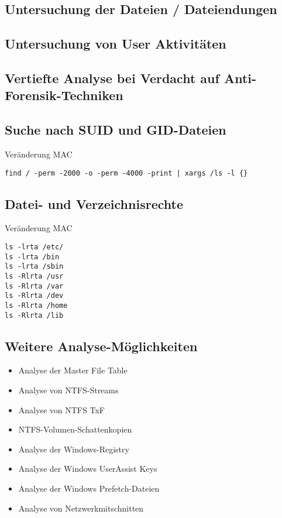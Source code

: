 \subsection{Untersuchung der Dateien / Dateiendungen}

\subsection{Untersuchung von User Aktivitäten}

\subsection{Vertiefte Analyse bei Verdacht auf Anti-Forensik-Techniken}

\subsection{Suche nach SUID und GID-Dateien}
Veränderung MAC
\begin{verbatim}
find / -perm -2000 -o -perm -4000 -print | xargs /ls -l {}
\end{verbatim}

\subsection{Datei- und Verzeichnisrechte}
Veränderung MAC
\begin{verbatim}
ls -lrta /etc/
ls -lrta /bin
ls -lrta /sbin
ls -Rlrta /usr
ls -Rlrta /var
ls -Rlrta /dev
ls -Rlrta /home
ls -Rlrta /lib
\end{verbatim}

\subsection{Weitere Analyse-Möglichkeiten}
\begin{itemize}
\item Analyse der Master File Table
\item Analyse von NTFS-Streams
\item Analyse von NTFS TxF
\item NTFS-Volumen-Schattenkopien
\item Analyse der Windows-Registry
\item Analyse der Windows UserAssist Keys
\item Analyse der Windows Prefetch-Dateien
\item Analyse von Netzwerkmitschnitten
\end{itemize}

